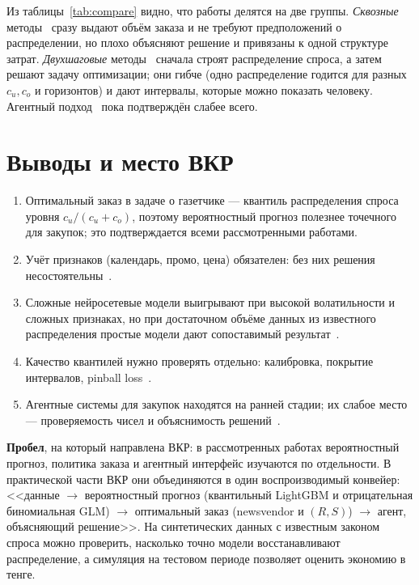 \documentclass[12pt,a4paper]{article}
\begin{document}
Из таблицы~\ref{tab:compare} видно, что работы делятся на две группы.
\emph{Сквозные} методы~\cite{ban2019bigdata,oroojlooy2016deep} сразу
выдают объём заказа и не требуют предположений о распределении, но
плохо объясняют решение и привязаны к одной структуре затрат.
\emph{Двухшаговые} методы~\cite{gong2024generative,ngartera2026stochastic}
сначала строят распределение спроса, а затем решают задачу оптимизации;
они гибче (одно распределение годится для разных $c_u, c_o$ и
горизонтов) и дают интервалы, которые можно показать человеку.
Агентный подход~\cite{syed2025agentic} пока подтверждён слабее всего.

\section{Выводы и место ВКР}

\begin{enumerate}
  \item Оптимальный заказ в задаче о газетчике --- квантиль
        распределения спроса уровня $c_u/(c_u+c_o)$, поэтому
        вероятностный прогноз полезнее точечного для закупок;
        это подтверждается всеми рассмотренными работами.
  \item Учёт признаков (календарь, промо, цена) обязателен:
        без них решения несостоятельны~\cite{ban2019bigdata}.
  \item Сложные нейросетевые модели выигрывают при высокой
        волатильности и сложных признаках, но при достаточном объёме
        данных из известного распределения простые модели дают сопоставимый
        результат~\cite{oroojlooy2016deep}.
  \item Качество квантилей нужно проверять отдельно: калибровка,
        покрытие интервалов, pinball loss~\cite{gneiting2007scoring,ngartera2026stochastic}.
  \item Агентные системы для закупок находятся на ранней стадии;
        их слабое место --- проверяемость чисел и объяснимость решений~\cite{syed2025agentic}.
\end{enumerate}

\textbf{Пробел}, на который направлена ВКР: в рассмотренных работах
вероятностный прогноз, политика заказа и агентный интерфейс изучаются
по отдельности. В практической части ВКР они объединяются в один
воспроизводимый конвейер: <<данные $\to$ вероятностный прогноз
(квантильный LightGBM и отрицательная биномиальная GLM) $\to$
оптимальный заказ (newsvendor и $(R,S)$) $\to$ агент, объясняющий
решение>>. На синтетических данных с известным законом спроса можно
проверить, насколько точно модели восстанавливают распределение, а
симуляция на тестовом периоде позволяет оценить экономию в тенге.



\end{document}
